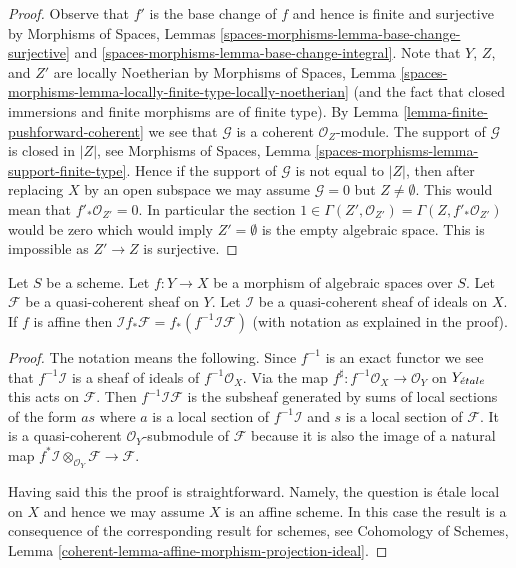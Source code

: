 \begin{proof}
Observe that $f'$ is the base change of $f$ and hence is finite
and surjective by Morphisms of Spaces, Lemmas
\ref{spaces-morphisms-lemma-base-change-surjective} and
\ref{spaces-morphisms-lemma-base-change-integral}.
Note that $Y$, $Z$, and $Z'$ are locally Noetherian by
Morphisms of Spaces, Lemma
\ref{spaces-morphisms-lemma-locally-finite-type-locally-noetherian}
(and the fact that closed immersions and finite morphisms
are of finite type). By Lemma \ref{lemma-finite-pushforward-coherent}
we see that $\mathcal{G}$ is a coherent $\mathcal{O}_Z$-module.
The support of $\mathcal{G}$ is closed in $|Z|$, see
Morphisms of Spaces, Lemma
\ref{spaces-morphisms-lemma-support-finite-type}.
Hence if the support of $\mathcal{G}$ is not equal to $|Z|$,
then after replacing $X$ by an open subspace we may assume
$\mathcal{G} = 0$ but $Z \not = \emptyset$.
This would mean that $f'_*\mathcal{O}_{Z'} = 0$. In particular the section
$1 \in \Gamma(Z', \mathcal{O}_{Z'}) = \Gamma(Z, f'_*\mathcal{O}_{Z'})$
would be zero which would imply $Z' = \emptyset$ is the empty
algebraic space. This is impossible as $Z' \to Z$ is surjective.
\end{proof}

\begin{lemma}
\label{lemma-affine-morphism-projection-ideal}
Let $S$ be a scheme. Let $f : Y \to X$ be a morphism of algebraic spaces
over $S$. Let $\mathcal{F}$ be a quasi-coherent sheaf on $Y$.
Let $\mathcal{I}$ be a quasi-coherent sheaf of ideals on $X$.
If $f$ is affine then
$\mathcal{I}f_*\mathcal{F} = f_*(f^{-1}\mathcal{I}\mathcal{F})$
(with notation as explained in the proof).
\end{lemma}

\begin{proof}
The notation means the following. Since $f^{-1}$ is an exact functor
we see that $f^{-1}\mathcal{I}$ is a sheaf
of ideals of $f^{-1}\mathcal{O}_X$. Via the map
$f^\sharp : f^{-1}\mathcal{O}_X \to \mathcal{O}_Y$
on $Y_{\acute{e}tale}$ this acts on $\mathcal{F}$.
Then $f^{-1}\mathcal{I}\mathcal{F}$ is the subsheaf
generated by sums of local sections of the form $as$ where $a$
is a local section of $f^{-1}\mathcal{I}$ and $s$ is a local section
of $\mathcal{F}$. It is a quasi-coherent $\mathcal{O}_Y$-submodule
of $\mathcal{F}$ because it is also the image of a natural map
$f^*\mathcal{I} \otimes_{\mathcal{O}_Y} \mathcal{F} \to \mathcal{F}$.

\medskip\noindent
Having said this the proof is straightforward. Namely, the question is
\'etale local on $X$ and hence we may assume $X$ is an affine scheme.
In this case the result is a consequence of the corresponding result
for schemes, see Cohomology of Schemes, Lemma
\ref{coherent-lemma-affine-morphism-projection-ideal}.
\end{proof}

